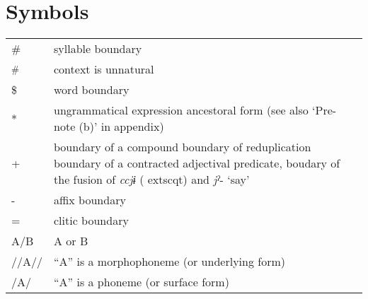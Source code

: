 \section*{Symbols}\enlargethispage{\baselineskip}
\begin{tabularx}{\textwidth}{@{}lQ@{}}
\#    & syllable boundary\\
\textsuperscript{\#}    & context is unnatural\\
\$    & word boundary\\
*    & ungrammatical expression ancestoral form (see also ‘Pre-note (b)’ in appendix)\\
+    & boundary of a compound boundary of reduplication boundary of a contracted adjectival predicate, boudary of the fusion of \textit{ccjɨ} (	extsc{qt}) and \textit{jˀ}{}- ‘say’\\
{}-    & affix boundary\\
=    & clitic boundary\\
A/B    & A or B\\
//A//    & “A” is a morphophoneme (or underlying form)\\
/A/    & “A” is a phoneme (or surface form)
\end{tabularx}
